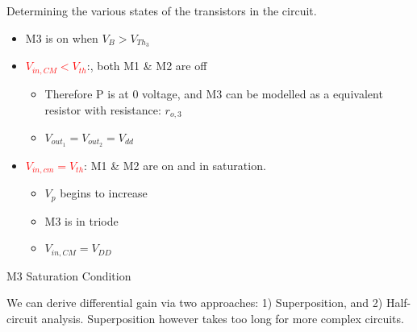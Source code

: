 \documentclass[a4paper,11pt]{article}
\begin{document}
Determining the various states of the transistors in the circuit.
\begin{itemize}
    \item M3 is on when $V_{B} > V_{Th_{3}}$
    \item \textcolor{red}{$V_{in,CM} < V_{th}$}:, both M1 \& M2 are off \begin{itemize}
        \item Therefore P is at 0 voltage, and M3 can be modelled as a equivalent resistor with resistance: $r_{o,3}$
        \item $V_{out_{1}} = V_{out_{2}} = V_{dd}$
    \end{itemize}
    \item \textcolor{red}{$V_{in,cm} = V_{th}$}: M1 \& M2 are on and in saturation. \begin{itemize}
        \item $V_{p}$ begins to increase
        \item M3 is in triode
        \item $V_{in,CM} = V_{DD}$
    \end{itemize}
\end{itemize}
\begin{notederivation}[mode=steps, explanation=beside]{M3 Saturation Condition}
\end{notederivation}


We can derive differential gain via two approaches: 1) Superposition, and 2) Half-circuit analysis. Superposition however takes too long for more complex 
circuits.
\end{document}
